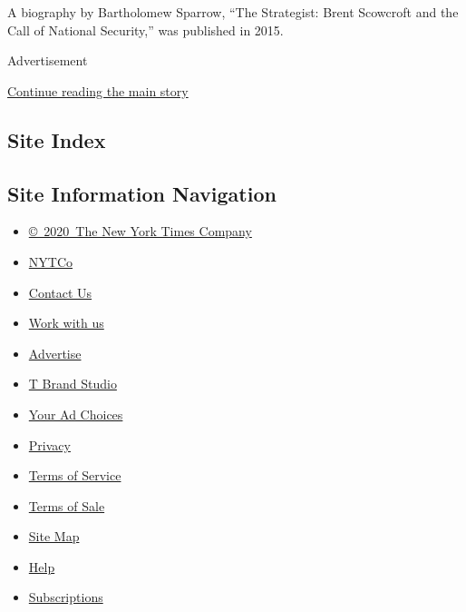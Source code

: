 A biography by Bartholomew Sparrow, ``The Strategist: Brent Scowcroft
and the Call of National Security,'' was published in 2015.

Advertisement

\protect\hyperlink{after-bottom}{Continue reading the main story}

\hypertarget{site-index}{%
\subsection{Site Index}\label{site-index}}

\hypertarget{site-information-navigation}{%
\subsection{Site Information
Navigation}\label{site-information-navigation}}

\begin{itemize}
\tightlist
\item
  \href{https://help.nytimes.com/hc/en-us/articles/115014792127-Copyright-notice}{©~2020~The
  New York Times Company}
\end{itemize}

\begin{itemize}
\tightlist
\item
  \href{https://www.nytco.com/}{NYTCo}
\item
  \href{https://help.nytimes.com/hc/en-us/articles/115015385887-Contact-Us}{Contact
  Us}
\item
  \href{https://www.nytco.com/careers/}{Work with us}
\item
  \href{https://nytmediakit.com/}{Advertise}
\item
  \href{http://www.tbrandstudio.com/}{T Brand Studio}
\item
  \href{https://www.nytimes.com/privacy/cookie-policy\#how-do-i-manage-trackers}{Your
  Ad Choices}
\item
  \href{https://www.nytimes.com/privacy}{Privacy}
\item
  \href{https://help.nytimes.com/hc/en-us/articles/115014893428-Terms-of-service}{Terms
  of Service}
\item
  \href{https://help.nytimes.com/hc/en-us/articles/115014893968-Terms-of-sale}{Terms
  of Sale}
\item
  \href{https://spiderbites.nytimes.com}{Site Map}
\item
  \href{https://help.nytimes.com/hc/en-us}{Help}
\item
  \href{https://www.nytimes.com/subscription?campaignId=37WXW}{Subscriptions}
\end{itemize}

